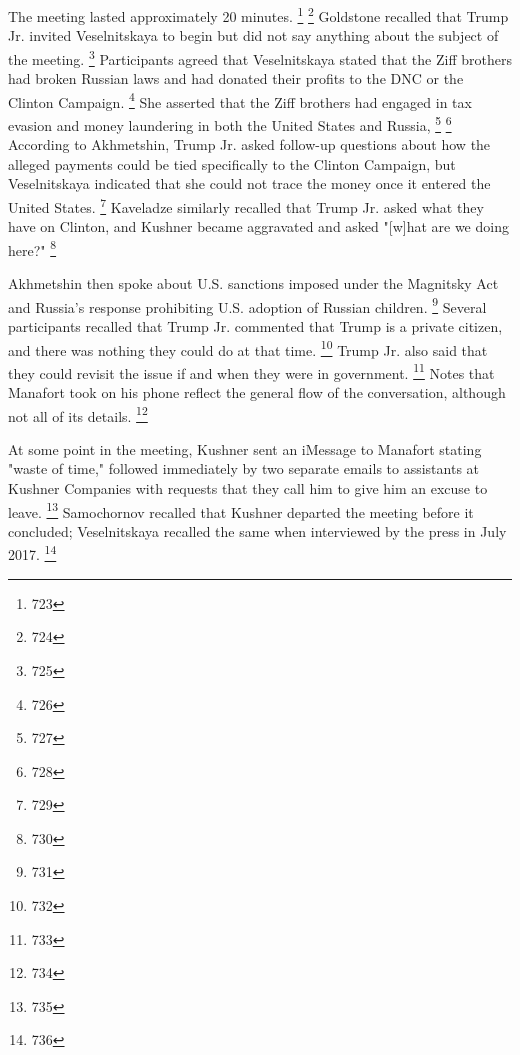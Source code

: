 The meeting lasted approximately 20 minutes.%
\footnote{723}
\footnote{724}
 Goldstone recalled that Trump Jr. invited Veselnitskaya to begin but did not say anything about the subject of the meeting.%
\footnote{725}
Participants agreed that Veselnitskaya stated that the Ziff brothers had broken Russian laws and had donated their profits to the DNC or the Clinton Campaign.%
\footnote{726}
She asserted that the Ziff brothers had engaged in tax evasion and money laundering in both the United States and Russia,%
\footnote{727}
\footnote{728}
According to Akhmetshin, Trump Jr. asked follow-up questions about how the alleged payments could be tied specifically to the Clinton Campaign, but Veselnitskaya indicated that she could not trace the money once it entered the United States.%
\footnote{729}
Kaveladze similarly recalled that Trump Jr. asked what they have on Clinton, and Kushner became aggravated and asked "[w]hat are we doing here?"%
\footnote{730}

Akhmetshin then spoke about U.S. sanctions imposed under the Magnitsky Act and Russia's response prohibiting U.S. adoption of Russian children.%
\footnote{731}
Several participants recalled that Trump Jr. commented that Trump is a private citizen, and there was nothing they could do at that time.%
\footnote{732}
Trump Jr. also said that they could revisit the issue if and when they were in government.%
\footnote{733}
Notes that Manafort took on his phone reflect the general flow of the conversation, although not all of its details.%
\footnote{734}

At some point in the meeting, Kushner sent an iMessage to Manafort stating "waste of time," followed immediately by two separate emails to assistants at Kushner Companies with requests that they call him to give him an excuse to leave.%
\footnote{735}
Samochornov recalled that Kushner departed the meeting before it concluded; Veselnitskaya recalled the same when interviewed by the press in July 2017.%
\footnote{736}

